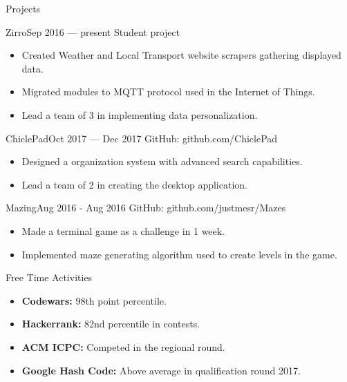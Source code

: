 \documentclass[]{mcdowellcv}
\begin{document}
	\begin{cvsection}{Projects}
		\begin{cvsubsection}{Zirro}{}{Sep 2016 — present}
			Student project
			\begin{itemize}
				\item Created Weather and Local Transport website scrapers gathering displayed data.
				\item Migrated modules to MQTT protocol used in the Internet of Things.
				\item Lead a team of 3 in implementing data personalization.
			\end{itemize}
		\end{cvsubsection}

		\begin{cvsubsection}{ChiclePad}{}{Oct 2017 — Dec 2017}
			GitHub: github.com/ChiclePad
			\begin{itemize}
				\item Designed a organization system with advanced search capabilities.
				\item Lead a team of 2 in creating the desktop application.
			\end{itemize}
		\end{cvsubsection}

		\begin{cvsubsection}{Mazing}{}{Aug 2016 - Aug 2016}
			GitHub: github.com/justmesr/Mazes
			\begin{itemize}
				\item Made a terminal game as a challenge in 1 week.
				\item Implemented maze generating algorithm used to create levels in the game. 
			\end{itemize}
		\end{cvsubsection}
	\end{cvsection}
	
	\begin{cvsection}{Free Time Activities}
		\begin{cvsubsection}{}{}{}	
			\begin{itemize}
				\item \textbf{Codewars:} 98th point percentile.
				\item \textbf{Hackerrank:} 82nd percentile in contests.
                \item \textbf{ACM ICPC:} Competed in the regional round.
                \item \textbf{Google Hash Code:} Above average in qualification round 2017.
			\end{itemize}
		\end{cvsubsection}
	\end{cvsection}
	
\end{document}
